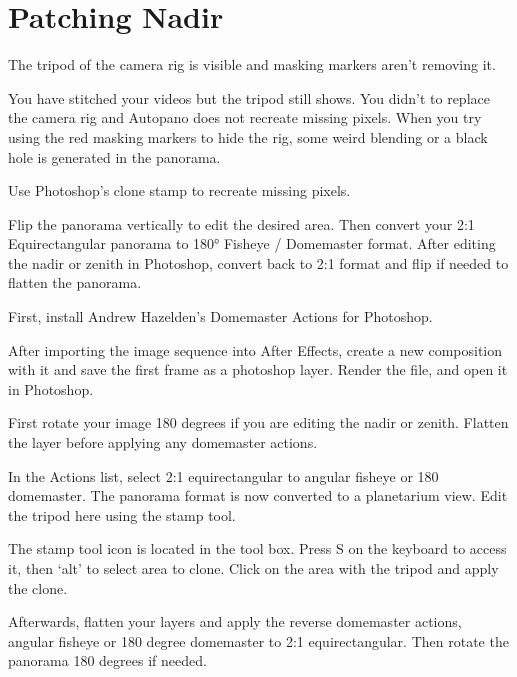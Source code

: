 \chapter{Patching Nadir}
\pagecolor{white}
\label{chap:48}
\begin{fullwidth}

\problem

{\large The tripod of the camera rig is visible and masking markers aren’t removing it. \par}

You have stitched your videos but the tripod still shows. You didn't \textbf{} to replace the camera rig and Autopano does not recreate missing pixels. When you try using the red masking markers to hide the rig, some weird blending or a black hole is generated in the panorama.

\solution

{\large Use Photoshop’s clone stamp to recreate missing pixels. \par}

Flip the panorama vertically to edit the desired area. Then convert your 2:1 Equirectangular panorama to 180° Fisheye / Domemaster format. After editing the nadir or zenith in Photoshop, convert back to 2:1 format and flip if needed to flatten the panorama.

First, install Andrew Hazelden's Domemaster Actions for Photoshop.

After importing the image sequence into After Effects, create a new composition with it and save the first frame as a photoshop layer. Render the file, and open it in Photoshop.


First rotate your image 180 degrees if you are editing the nadir or zenith. Flatten the layer before applying any domemaster actions.


In the Actions list, select 2:1 equirectangular to angular fisheye or 180 domemaster. The panorama format is now converted to a planetarium view. Edit the tripod here using the stamp tool.


\tip The stamp tool icon is located in the tool box. Press S on the keyboard to access it, then ‘alt’ to select area to clone. Click on the area with the tripod and apply the clone.

Afterwards, flatten your layers and apply the reverse domemaster actions, angular fisheye or 180 degree domemaster to 2:1 equirectangular. Then rotate the panorama 180 degrees if needed. 


\end{fullwidth}
